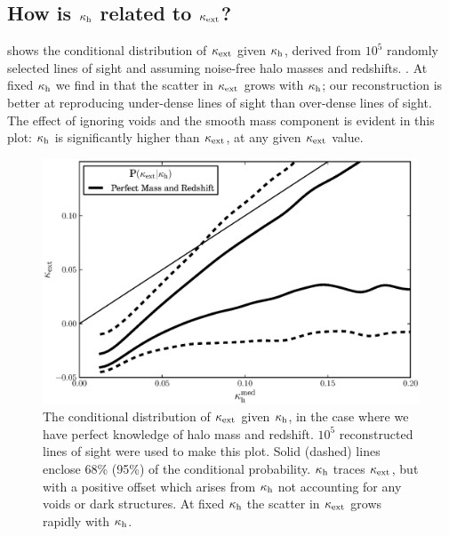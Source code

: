 \documentclass[useAMS,usenatbib,a4paper]{mn2e}
\begin{document}

\subsection{How is $\kappa_{\rm h}$ related to $\kappa_{\rm ext}$?}

 shows the conditional distribution of $\kappa_{\rm ext}$ given 
$\kappa_{\rm h}$, derived from $10^5$ randomly selected \MS lines of sight
and assuming noise-free halo masses and redshifts. 
.
At fixed $\kappa_{\rm h}$ we find in  that the scatter in 
$\kappa_{\rm ext}$
grows with $\kappa_{\rm h}$; our reconstruction is better at reproducing under-dense
lines of sight than over-dense lines of sight. The effect of ignoring voids
and the smooth mass component is evident in this plot: $\kappa_{\rm h}$ is
significantly higher than $\kappa_{\rm ext}$, at any given $\kappa_{\rm ext}$ value. 

\begin{figure}
\includegraphics[width=\columnwidth]{figs/cornerplot.eps}
\caption[Biased?]{The conditional distribution of 
$\kappa_{\rm ext}$ given $\kappa_{\rm h}$, in the case where  
we have perfect knowledge of halo mass and redshift.
$10^5$ reconstructed lines of
sight were used to make this plot. 
Solid (dashed) lines enclose 68\% (95\%) of the conditional probability.
$\kappa_{\rm h}$ traces $\kappa_{\rm ext}$, but with a positive offset which arises from
$\kappa_{\rm h}$ not accounting for any voids or dark structures.
At fixed $\kappa_{\rm h}$ the scatter in $\kappa_{\rm ext}$ grows rapidly with $\kappa_{\rm h}$.
}
\label{fig:jointkh-k}
\end{figure}
\end{document}
